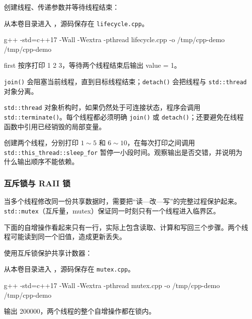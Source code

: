 \begin{example}
创建线程、传递参数并等待线程结束：



从本卷目录进入 ，源码保存在 \texttt{lifecycle.cpp}。
\begin{tbash}
g++ -std=c++17 -Wall -Wextra -pthread lifecycle.cpp -o /tmp/cpp-demo
/tmp/cpp-demo
\end{tbash}
first 按序打印 1 2 3，等待两个线程结束后输出 value = 1。
\end{example}

\texttt{join()} 会阻塞当前线程，直到目标线程结束；\texttt{detach()} 会把线程与 \texttt{std::thread} 对象分离。

\begin{note}
\texttt{std::thread} 对象析构时，如果仍然处于可连接状态，程序会调用 \texttt{std::terminate()}。每个线程都必须明确 \texttt{join()} 或 \texttt{detach()}；还要避免在线程函数中引用已经销毁的局部变量。
\end{note}

\begin{exercise}\label{ex:v1-cpp-thread-print}

创建两个线程，分别打印 $1\sim5$ 和 $6\sim10$，在每次打印之间调用 \texttt{std::this\_thread::sleep\_for} 暂停一小段时间。观察输出是否交错，并说明为什么输出顺序不能依赖。
\end{exercise}

\subsubsection{互斥锁与 RAII 锁}
当多个线程修改同一份共享数据时，需要把“读—改—写”的完整过程保护起来。\texttt{std::mutex}（互斥量，mutex）保证同一时刻只有一个线程进入临界区。

下面的自增操作看起来只有一行，实际上包含读取、计算和写回三个步骤。两个线程可能读到同一个旧值，造成更新丢失。

\begin{example}
使用互斥锁保护共享计数器：



从本卷目录进入 ，源码保存在 \texttt{mutex.cpp}。
\begin{tbash}
g++ -std=c++17 -Wall -Wextra -pthread mutex.cpp -o /tmp/cpp-demo
/tmp/cpp-demo
\end{tbash}
输出 200000，两个线程的整个自增操作都在锁内。
\end{example}

